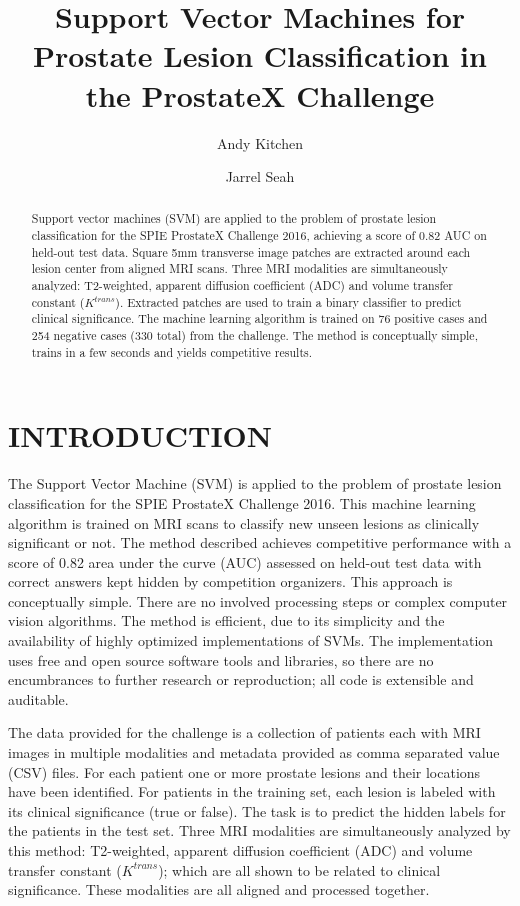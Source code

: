 \documentclass[a4paper]{spie}
\title{Support Vector Machines for Prostate Lesion Classification in the ProstateX Challenge}
\author[a]{Andy Kitchen}
\author[b]{Jarrel Seah}
\affil[a]{Silverpond Pty. Ltd.,
  2/382 Little Collins Street,
  Melbourne VIC 3000, Australia}
\affil[b]{STAT Innovations Pty. Ltd.,
  PO Box 274, Ashburton VIC 3147,
  Australia}
\begin{document}
 
\maketitle

\begin{abstract}
Support vector machines (SVM) are applied to the problem of prostate lesion classification for the SPIE ProstateX Challenge 2016, achieving a score of 0.82 AUC on held-out test data. Square 5mm transverse image patches are extracted around each lesion center from aligned MRI scans. Three MRI modalities are simultaneously analyzed: T2-weighted, apparent diffusion coefficient (ADC) and volume transfer constant ($K^{\mathit{trans}}$). Extracted patches are used to train a binary classifier to predict clinical significance.  The machine learning algorithm is trained on 76 positive cases and 254 negative cases (330 total) from the challenge. The method is conceptually simple, trains in a few seconds and yields competitive results.
\end{abstract}


\section{INTRODUCTION}

The Support Vector Machine\cite{CortesVapnik1995} (SVM) is applied to the problem of prostate lesion classification for the SPIE ProstateX Challenge 2016. This machine learning algorithm is trained on MRI scans to classify new unseen lesions as clinically significant or not. The method described achieves competitive performance with a score of 0.82 area under the curve (AUC) assessed on held-out test data with correct answers kept hidden by competition organizers. This approach is conceptually simple. There are no involved processing steps or complex computer vision algorithms. The method is efficient, due to its simplicity and the availability of highly optimized implementations of SVMs. The implementation uses free and open source software tools and libraries, so there are no encumbrances to further research or reproduction; all code is extensible and auditable.

The data provided for the challenge is a collection of patients each with MRI images in multiple modalities and metadata provided as comma separated value (CSV) files. For each patient one or more prostate lesions and their locations have been identified. For patients in the training set, each lesion is labeled with its clinical significance (true or false). The task is to predict the hidden labels for the patients in the test set. Three MRI modalities are simultaneously analyzed by this method: T2-weighted, apparent diffusion coefficient (ADC) and volume transfer constant ($K^{\mathit{trans}}$); which are all shown to be related to clinical significance\cite{langer2010prostate}. These modalities are all aligned and processed together.
\end{document}
